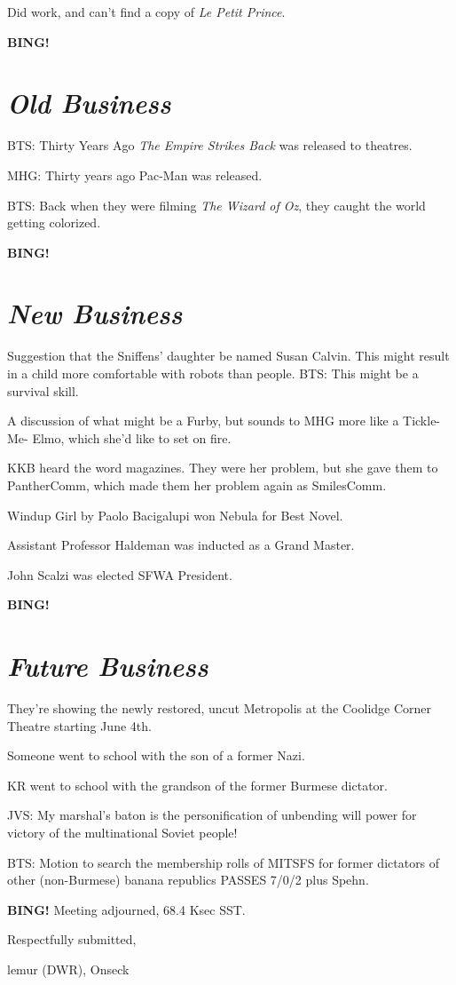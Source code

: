 \documentclass[10pt]{article}
\newcommand{\bing}{{\bf BING!} }
\newcommand{\goto}[1]{\bing \vskip 12pt \section*{{\em{#1}}}}
\newcommand{\ps}{ plus Spehn\xspace}
\newcommand{\onseck}{lemur (DWR), Onseck}
\begin{document}
Did work, and can't find a copy of \emph{Le Petit Prince}.


\goto{Old Business}

BTS: Thirty Years Ago \emph{The Empire Strikes Back} was released to theatres.

MHG: Thirty years ago Pac-Man was released.

BTS: Back when they were filming \emph{The Wizard of Oz}, they caught the 
world getting colorized.

\goto{New Business}

Suggestion that the Sniffens' daughter be named Susan Calvin.  This might
result in a child more comfortable with robots than people.  BTS: This might be
a survival skill.

A discussion of what might be a Furby, but sounds to MHG more like a Tickle-Me-
Elmo, which she'd like to set on fire.

KKB heard the word magazines.  They were her problem, but she gave them to
PantherComm, which made them her problem again as SmilesComm.

Windup Girl by Paolo Bacigalupi won Nebula for Best Novel.

Assistant Professor Haldeman was inducted as a Grand Master.

John Scalzi was elected SFWA President.

\goto{Future Business}

They're showing the newly restored, uncut Metropolis at the Coolidge Corner
Theatre starting June 4th.

Someone went to school with the son of a former Nazi.

KR went to school with the grandson of the former Burmese dictator.

JVS: My marshal's baton is the personification of unbending will power
for victory of the multinational Soviet people!

BTS: Motion to search the membership rolls of MITSFS for former dictators
of other (non-Burmese) banana republics PASSES 7/0/2\ps.

\bing
\noindent
Meeting adjourned, 68.4 Ksec SST.

\vspace{18pt}

\centerline{Respectfully submitted,}
\centerline{\onseck}
\end{document}
